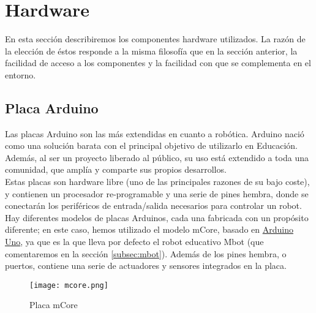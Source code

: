 \section{Hardware}\label{sec:hardware}
En esta sección describiremos los componentes hardware utilizados. La razón de la elección de éstos responde a la misma filosofía que en la sección anterior, la facilidad de acceso a los componentes y la facilidad con que se complementa en el entorno.
\subsection{Placa Arduino}\label{subsec:placaBase}
Las placas Arduino son las más extendidas en cuanto a robótica. Arduino nació como una solución barata con el principal objetivo de utilizarlo en Educación. Además, al ser un proyecto liberado al público, su uso está extendido a toda una comunidad, que amplía y comparte sus propios desarrollos.\\
Estas placas son hardware libre (uno de las principales razones de su bajo coste), y contienen un procesador re-programable y una serie de pines hembra, donde se conectarán los periféricos de entrada/salida necesarios para controlar un robot. Hay diferentes modelos de placas Arduinos, cada una fabricada con un propósito diferente; en este caso, hemos utilizado el modelo mCore, basado en \href{https://arduino.cl/producto/arduino-uno/}{Arduino Uno}, ya que es la que lleva por defecto el robot educativo Mbot (que comentaremos en la sección \ref{subsec:mbot}). Además de los pines hembra, o puertos, contiene una serie de actuadores y sensores integrados en la placa.
\begin{figure}[H]
		\texttt{[image: mcore.png]}\centering
	\label{img:Mcore}
	\caption{Placa mCore}
\end{figure}
